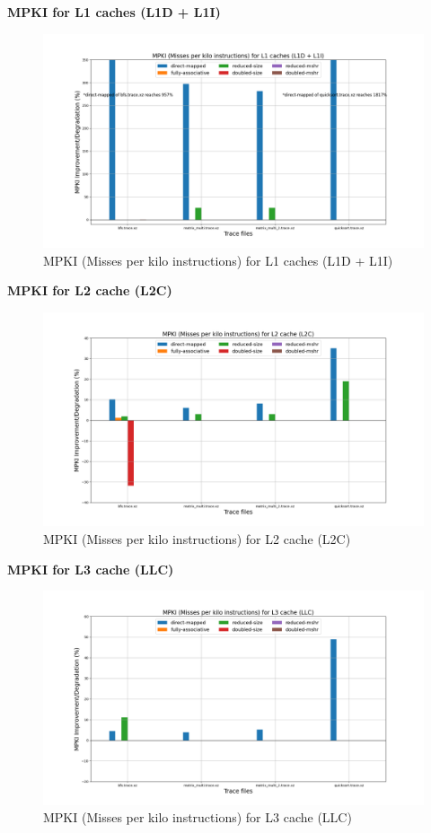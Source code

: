 \documentclass[11pt, swedish, openany]{book}
\begin{document}
\textbf{MPKI for L1 caches (L1D + L1I)}
\begin{figure}[H]
    \centering
    \includegraphics[scale=0.35]{champsim/mpki_l1.png}
    \caption{MPKI (Misses per kilo instructions) for L1 caches (L1D + L1I)}
\end{figure}

\textbf{MPKI for L2 cache (L2C)}
\begin{figure}[H]
    \centering
    \includegraphics[scale=0.35]{champsim/mpki_l2.png}
    \caption{MPKI (Misses per kilo instructions) for L2 cache (L2C)}
\end{figure}

\textbf{MPKI for L3 cache (LLC)}
\begin{figure}[H]
    \centering
    \includegraphics[scale=0.35]{champsim/mpki_l3.png}
    \caption{MPKI (Misses per kilo instructions) for L3 cache (LLC)}
\end{figure}
\end{document}
